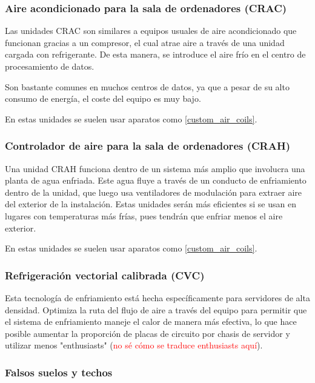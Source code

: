 \subsubsection{Aire acondicionado para la sala de ordenadores (CRAC)}

Las unidades CRAC son similares a equipos usuales de aire acondicionado que funcionan gracias a un compresor, el cual atrae aire a través de una unidad cargada con refrigerante. De esta manera, se introduce el aire frío en el centro de procesamiento de datos.

Son bastante comunes en muchos centros de datos, ya que a pesar de su alto consumo de energía, el coste del equipo es muy bajo.

En estas unidades se suelen usar aparatos como \eqref{custom_air_coils}.

\subsubsection{Controlador de aire para la sala de ordenadores (CRAH)}

Una unidad CRAH funciona dentro de un sistema más amplio que involucra una planta de agua enfriada. Este agua fluye a través de un conducto de enfriamiento dentro de la unidad, que luego usa ventiladores de modulación para extraer aire del exterior de la instalación. Estas unidades serán más eficientes si se usan en lugares con temperaturas más frías, pues tendrán que enfriar menos el aire exterior.

En estas unidades se suelen usar aparatos como \eqref{custom_air_coils}.

\subsubsection{Refrigeración vectorial calibrada (CVC)}

Esta tecnología de enfriamiento está hecha específicamente para servidores de alta densidad. Optimiza la ruta del flujo de aire a través del equipo para permitir que el sistema de enfriamiento maneje el calor de manera más efectiva, lo que hace posible aumentar la proporción de placas de circuito por chasis de servidor y utilizar menos "enthusiasts" (\textcolor{red}{no sé cómo se traduce enthusiasts aquí}).

\subsubsection{Falsos suelos y techos}

